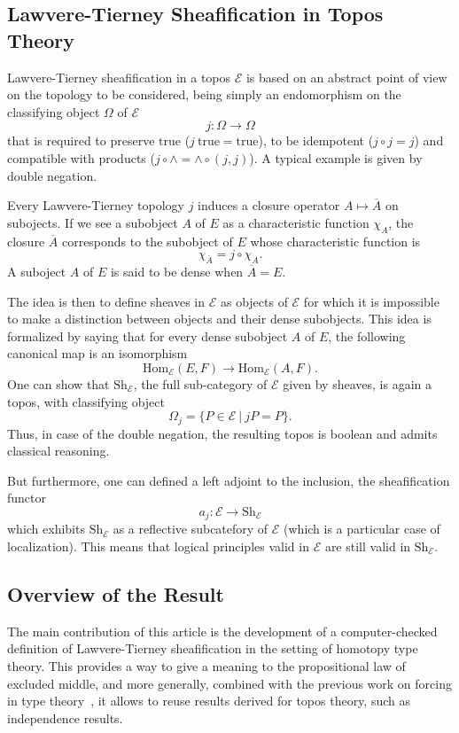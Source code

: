 \documentclass[conference]{IEEEtran}
\newcommand \True {\mathrm{true}}
\newcommand \closure[1] {\overline{#1}}
\newcommand \Char[1] {\chi_{#1}}%
\newcommand \E {\mathcal{E}}
\newcommand \Hom[1] {\mathrm{Hom}_{#1}}
\newcommand \Sh[1] {\mathrm{Sh}_{#1}}
\begin{document}
\subsection{Lawvere-Tierney Sheafification in Topos Theory}

Lawvere-Tierney sheafification in a topos $\E$ is based on an abstract
point of view on the topology to be considered, being simply an
endomorphism on the classifying object $\Omega$ of $\E$  
%
$$
j : \Omega \rightarrow \Omega
$$
%
that is required to preserve $\True$ ($j \ \True = \True$), to be
idempotent ($j \circ j = j$) and compatible with products ($j \circ
\wedge = \wedge \circ (j, j)$).
%
A typical example is given by double negation.

Every Lawvere-Tierney topology $j$ induces a closure operator
$A \mapsto \closure{A}$ on subojects. If we see a subobject $A$ of $E$
as a characteristic function $\Char{A}$, the closure $\closure{A}$
corresponds to the subobject of $E$ whose characteristic function is 
%
$$
\Char{\closure{A}} = j \circ \Char{A}.
$$
%
A suboject $A$ of $E$ is said to
be dense when $\closure{A} = E$.

The idea is then to define sheaves in $\E$ as objects of $\E$ for
which it is impossible to make a distinction between objects and their
dense subobjects. This idea is formalized by saying that for every
dense subobject $A$ of $E$, the following canonical map is an
isomorphism
%
\begin{equation}\label{equ:sheaf_def}
\Hom{\E}(E,F) \rightarrow \Hom{\E}(A,F).
\end{equation}
%
One can show that $\Sh{\E}$, the full sub-category of $\E$ given by
sheaves, is again a topos, with classifying object
%
$$
\Omega_j = \{ P \in \E \ | \ j P  = P \}.
$$
%
Thus, in case of the double negation, the resulting topos is boolean  
and admits classical reasoning.

But furthermore, one can defined a left adjoint to the inclusion, the
sheafification functor
%
$$
a_j : \E \rightarrow \Sh{\E}
$$
which exhibits $\Sh{\E}$ as a reflective
subcatefory of $\E$ (which is a particular case of localization). This
means that logical principles valid in $\E$ are still valid in
$\Sh{\E}$.


\subsection{Overview of the Result}

The main contribution of this article is the development of a
computer-checked definition of Lawvere-Tierney sheafification in the
setting of homotopy type theory.
%
This provides a way to give a meaning to the propositional law of
excluded middle, and more generally, combined with the previous work on
forcing in type theory~\cite{jaber2012extending}, it allows to reuse
results derived for topos theory, such as independence results.
\end{document}
